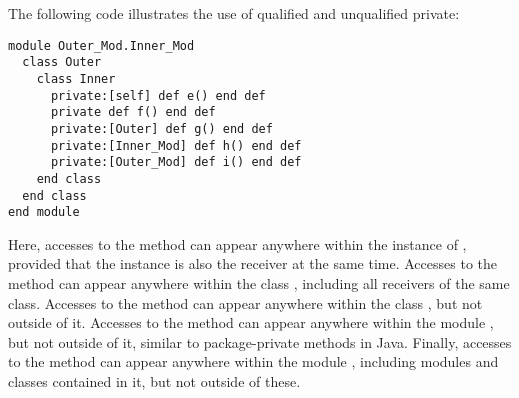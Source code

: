 \begin{itemize}
\example The following code illustrates the use of qualified and unqualified private: 
\begin{lstlisting}
module Outer_Mod.Inner_Mod
  class Outer
    class Inner
      private:[self] def e() end def
      private def f() end def
      private:[Outer] def g() end def
      private:[Inner_Mod] def h() end def
      private:[Outer_Mod] def i() end def
    end class
  end class
end module
\end{lstlisting}
Here, accesses to the method  can appear anywhere within the instance of , provided that the instance is also the receiver at the same time. Accesses to the method  can appear anywhere within the class , including all receivers of the same class. Accesses to the method  can appear anywhere within the class , but not outside of it. Accesses to the method  can appear anywhere within the module , but not outside of it, similar to package-private methods in Java. Finally, accesses to the method  can appear anywhere within the module , including modules and classes contained in it, but not outside of these.

\end{itemize}

